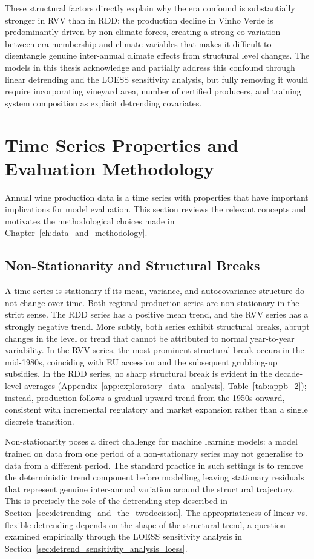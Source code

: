 These structural factors directly explain why the era confound is substantially stronger in RVV than in RDD: the production decline in Vinho Verde is predominantly driven by non-climate forces, creating a strong co-variation between era membership and climate variables that makes it difficult to disentangle genuine inter-annual climate effects from structural level changes. The models in this thesis acknowledge and partially address this confound through linear detrending and the LOESS sensitivity analysis, but fully removing it would require incorporating vineyard area, number of certified producers, and training system composition as explicit detrending covariates.


\section{Time Series Properties and Evaluation Methodology}\label{sec:time_series_properties_and}

Annual wine production data is a time series with properties that have important implications for model evaluation. This section reviews the relevant concepts and motivates the methodological choices made in Chapter~\ref{ch:data_and_methodology}.


\subsection{Non-Stationarity and Structural Breaks}\label{sub:nonstationarity_and_structural_breaks}

A time series is stationary if its mean, variance, and autocovariance structure do not change over time. Both regional production series are non-stationary in the strict sense. The RDD series has a positive mean trend, and the RVV series has a strongly negative trend. More subtly, both series exhibit structural breaks, abrupt changes in the level or trend that cannot be attributed to normal year-to-year variability. In the RVV series, the most prominent structural break occurs in the mid-1980s, coinciding with EU accession and the subsequent grubbing-up subsidies. In the RDD series, no sharp structural break is evident in the decade-level averages (Appendix~\ref{app:exploratory_data_analysis}, Table~\ref{tab:appb_2}); instead, production follows a gradual upward trend from the 1950s onward, consistent with incremental regulatory and market expansion rather than a single discrete transition.

Non-stationarity poses a direct challenge for machine learning models: a model trained on data from one period of a non-stationary series may not generalise to data from a different period. The standard practice in such settings is to remove the deterministic trend component before modelling, leaving stationary residuals that represent genuine inter-annual variation around the structural trajectory. This is precisely the role of the detrending step described in Section~\ref{sec:detrending_and_the_twodecision}. The appropriateness of linear vs. flexible detrending depends on the shape of the structural trend, a question examined empirically through the LOESS sensitivity analysis in Section~\ref{sec:detrend_sensitivity_analysis_loess}.


